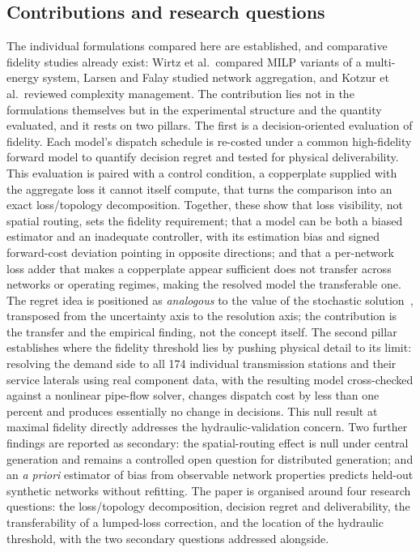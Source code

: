 \documentclass[a4paper,fleqn]{cas-sc}
\begin{document}
\subsection{Contributions and research questions}
The individual formulations compared here are established, and comparative fidelity studies
already exist: Wirtz et al.\ compared MILP variants of a multi-energy system, Larsen and
Falay studied network aggregation, and Kotzur et al.\ reviewed complexity management. The
contribution lies not in the formulations themselves but in the experimental structure and
the quantity evaluated, and it rests on two pillars. The first is a decision-oriented
evaluation of fidelity. Each model's dispatch schedule is re-costed under a common
high-fidelity forward model to quantify decision regret and tested for physical
deliverability. This evaluation is paired with a control condition, a copperplate supplied
with the aggregate loss it cannot itself compute, that turns the comparison into an exact
loss/topology decomposition. Together, these show that loss visibility, not spatial routing,
sets the fidelity requirement; that a model can be both a biased estimator and an inadequate
controller, with its estimation bias and signed forward-cost deviation pointing in opposite
directions; and that a per-network loss adder that makes a copperplate appear sufficient does
not transfer across networks or operating regimes, making the resolved model the transferable
one. The regret idea is positioned as \emph{analogous} to the value of the stochastic
solution~\citep{BirgeLouveaux2011}, transposed from the uncertainty axis to the resolution
axis; the contribution is the transfer and the empirical finding, not the concept itself.
The second pillar establishes where the fidelity threshold lies by pushing physical detail
to its limit: resolving the demand side to all 174 individual transmission stations and
their service laterals using real component data, with the resulting model cross-checked
against a nonlinear pipe-flow solver, changes dispatch cost by less than one percent and
produces essentially no change in decisions. This null result at maximal fidelity directly
addresses the hydraulic-validation concern. Two further findings are reported as secondary:
the spatial-routing effect is null under central generation and remains a controlled open
question for distributed generation; and an \emph{a priori} estimator of bias from observable
network properties predicts held-out synthetic networks without refitting. The paper is
organised around four research questions: the loss/topology decomposition, decision regret
and deliverability, the transferability of a lumped-loss correction, and the location of the
hydraulic threshold, with the two secondary questions addressed alongside.
\end{document}
